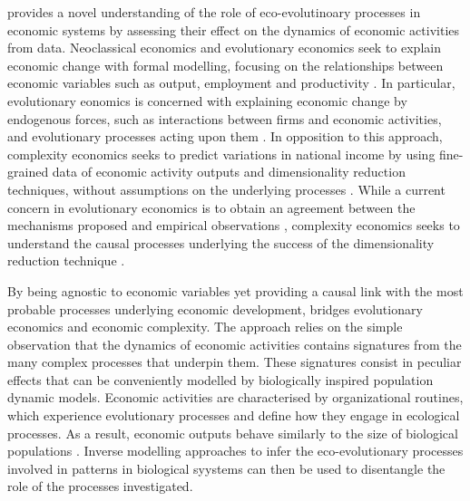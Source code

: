 % 
\chapiii provides a novel understanding of the role of eco-evolutinoary processes in economic systems by assessing their effect on the dynamics of economic activities from data.
% 
% 
Neoclassical economics and evolutionary economics seek to explain economic change with formal modelling, focusing on the relationships between economic variables such as output, employment and productivity \cite{Boschma2005a}.
% 
% 
In particular, evolutionary eonomics is concerned with explaining economic change by endogenous forces, such as interactions between firms and economic activities, and evolutionary processes acting upon them \cite{Hodgson2019,Metcalfe2006}.
% 
In opposition to this approach, complexity economics seeks to predict variations in national income by using fine-grained data of economic activity outputs and dimensionality reduction techniques, without assumptions on the underlying processes \cite{Hidalgo}. 
% 
%
While a current concern in evolutionary economics is to obtain an agreement between the mechanisms proposed and empirical observations \cite{XXX}, complexity economics seeks to understand the causal processes underlying the success of the dimensionality reduction technique \cite{XXX}.

By being agnostic to economic variables yet providing a causal link with the most probable processes underlying economic development, \chapiii bridges evolutionary economics and economic complexity.
% 
The approach relies on the simple observation that the dynamics of economic activities contains signatures from the many complex processes that underpin them.
% 
These signatures consist in peculiar effects that can be conveniently modelled by biologically inspired population dynamic models. Economic activities are characterised by organizational routines, which experience evolutionary processes and define how they engage in ecological processes.
% 
% 
As a result, economic outputs behave similarly to the size of biological populations \cite{Boschma2005a}.
% 
Inverse modelling approaches to infer the eco-evolutionary processes involved in patterns in biological syystems can then be used to disentangle the role of the processes investigated.

